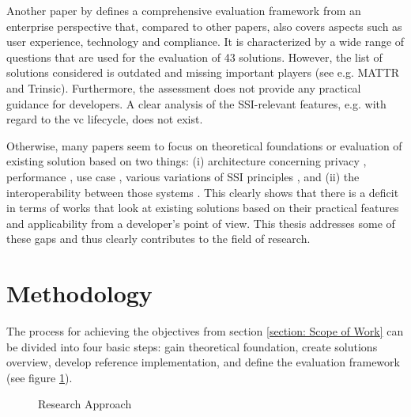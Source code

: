 	Another paper by \cite{kuperberg_blockchain-based_2020} defines a comprehensive evaluation framework from an enterprise perspective that, compared to other papers, also covers aspects such as user experience, technology and compliance. It is characterized by a wide range of questions that are used for the evaluation of 43 solutions. However, the list of solutions considered is outdated and missing important players (see e.g. MATTR and Trinsic). Furthermore, the assessment does not provide any practical guidance for developers. A clear analysis of the SSI-relevant features, e.g. with regard to the \ac{vc} lifecycle, does not exist. 
	
	Otherwise, many papers seem to focus on theoretical foundations or evaluation of existing solution based on two things: (i) architecture \cite{gruner_relevance_2018} concerning privacy \cite{bernabe_privacy-preserving_2019}, performance \cite{bouras_distributed_2020}, use case \cite{kuperberg_blockchain-based_2020}, various variations \cite{allen_path_2016, reed_decentralized_2021, allende_lopez_self-sovereign_2020, bouras_distributed_2020, ferdous_search_2019, cameron_laws_2005} of \ac{SSI} principles \cite{van_bokkem_self-sovereign_2019, bouras_distributed_2020, dib_decentralized_2020, dunphy_first_2018, ferdous_search_2019, friedewald_self-sovereign_2020}, and (ii) the interoperability between those systems \cite{homeland_security_preventing_2020, john_dhs_2020}. This clearly shows that there is a deficit in terms of works that look at existing solutions based on their practical features and applicability from a developer's point of view. This thesis addresses some of these gaps and thus clearly contributes to the field of research.
	
	\section{Methodology} %
    The process for achieving the objectives from section \ref{section: Scope of Work} can be divided into four basic steps: gain theoretical foundation, create solutions overview, develop reference implementation, and define the evaluation framework (see figure \ref{figure: approach}).
    
    \begin{figure}[ht]
	    \centering
        \caption{Research Approach}
        \label{figure: approach}
    \end{figure}
	
